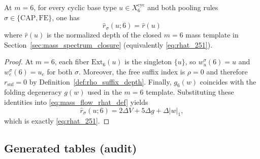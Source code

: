 \begin{proposition}[$m=6$ consistency with the closed mass template]\label{prop:mass_flow_m6_consistency}
At $m=6$, for every cyclic base type $u\in X_6^{\mathrm{cyc}}$ and both pooling rules
$\sigma\in\{\mathrm{CAP},\mathrm{FE}\}$, one has
\[
\widehat r_{\sigma}(u;6)=\widehat r(u)
\]
where $\widehat r(u)$ is the normalized depth of the closed $m=6$ mass template
in Section~\ref{sec:mass_spectrum_closure} (equivalently \eqref{eq:rhat_251}).
\end{proposition}
\begin{proof}
At $m=6$, each fiber $\mathrm{Ext}_6(u)$ is the singleton $\{u\}$,
so $w_u^{\sigma}(6)=u$ and $w_e^{\sigma}(6)=u_e$ for both $\sigma$.
Moreover, the free suffix index is $\rho=0$ and therefore $r_{\mathrm{suf}}=0$ by
Definition~\ref{def:rho_suffix_depth}.
Finally, $g_6(w)$ coincides with the folding degeneracy $g(w)$ used in the $m=6$ template.
Substituting these identities into \eqref{eq:mass_flow_rhat_def} yields
\[
\widehat r_{\sigma}(u;6)
=2\Delta V + 5\Delta g + \Delta |w|_1,
\]
which is exactly \eqref{eq:rhat_251}.
\end{proof}

\subsection{Generated tables (audit)}
\label{subsec:mass_flow_generated_tables}

